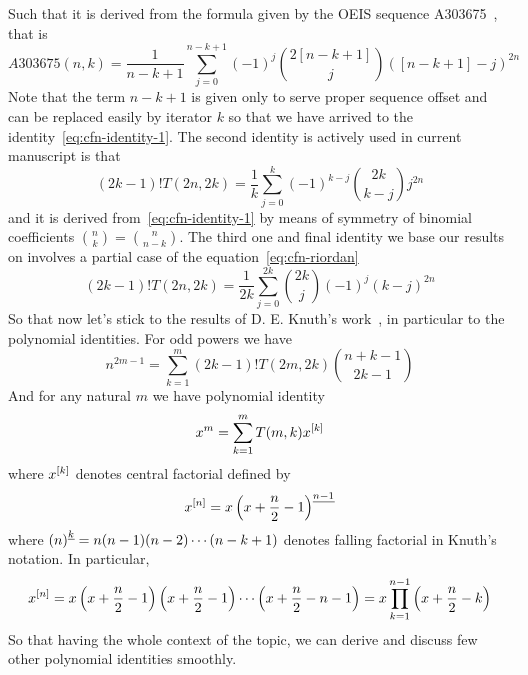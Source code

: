 Such that it is derived from the formula given by the OEIS sequence A303675~\cite{kolosov2018coefficients}, that is
\begin{equation*}
    A303675(n,k) = \frac{1}{n-k+1} \sum_{j=0}^{n-k+1} (-1)^{j} \binom{2[n-k+1]}{j} ([n-k+1]-j)^{2n}
\end{equation*}
Note that the term $n-k+1$ is given only to serve proper sequence offset and can be replaced easily by iterator $k$
so that we have arrived to the identity~\eqref{eq:cfn-identity-1}.
The second identity is actively used in current manuscript is that
\begin{equation}
(2k-1)
    !T(2n,2k) = \frac{1}{k} \sum_{j=0}^{k} (-1)^{k-j} \binom{2k}{k-j} j^{2n}\label{eq:cfn-identity-2}
\end{equation}
and it is derived from~\eqref{eq:cfn-identity-1} by means
of symmetry of binomial coefficients $\binom{n}{k} = \binom{n}{n-k}$.
The third one and final identity we base our results on involves a partial case of the equation~\eqref{eq:cfn-riordan}
\begin{equation}
(2k-1)
    !T(2n, 2k) = \frac{1}{2k} \sum_{j=0}^{2k} \binom{2k}{j} (-1)^{j} (k-j)^{2n}\label{eq:cfn-identity-3}
\end{equation}
So that now let's stick to the results of D. E. Knuth's work~\cite{knuth1993johann},
in particular to the polynomial identities.
For odd powers we have
\begin{equation}
    n^{2m-1} = \sum_{k=1}^{m} (2k-1)! T(2m,2k) \binom{n+k-1}{2k-1}\label{eq:knuth-odd-power}
\end{equation}
And for any natural $m$ we have polynomial identity
\begin{equation}
    x^m = \sum_{k=1}^{m} T(m, k) x^{[k]}\label{eq:knuth-power-identity}
\end{equation}
where $x^{[k]}$ denotes central factorial defined by
\begin{equation*}
    x^{[n]} = x \left(x+\frac{n}{2}-1 \right)^{\underline{n-1}}
\end{equation*}
where $\left(n \right)^{\underline{k}} = n (n-1) (n-2) \cdots (n-k+1)$ denotes falling factorial in Knuth's notation.
In particular,
\begin{equation*}
    x^{[n]}
    = x \left( x+\frac{n}{2}-1 \right) \left( x+\frac{n}{2}-1 \right) \cdots \left (x+\frac{n}{2}-n-1 \right)
    = x \prod_{k=1}^{n-1} \left( x+\frac{n}{2}-k \right)
\end{equation*}
So that having the whole context of the topic, we can derive and discuss few other polynomial identities smoothly.

